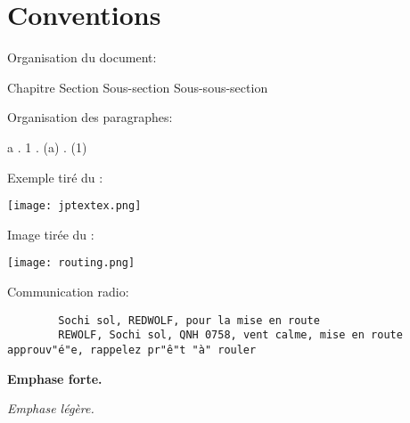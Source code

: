 \thispagestyle{default}



\section*{Conventions}

\e
    \item Organisation du document:

    {\Large Chapitre} {\large Section} Sous-section {\small Sous-sous-section}

    \item Organisation des paragraphes:

    {\Large a} . {\large 1} . (a) . {\small (1)}

    \item Exemple tiré du \jp{}:

    \texttt{[image: jptextex.png]}

    \item Image tirée du \jp{}:

    \texttt{[image: routing.png]}

    \item Communication radio:
    \begin{lstlisting}
        Sochi sol, REDWOLF, pour la mise en route
        REWOLF, Sochi sol, QNH 0758, vent calme, mise en route approuv"é"e, rappelez pr"ê"t "à" rouler
    \end{lstlisting}

    \item \textbf{Emphase forte.}

    \item \emph{Emphase légère.}

    \item {}
    
    
    \item {}

    \item {}

\ed 